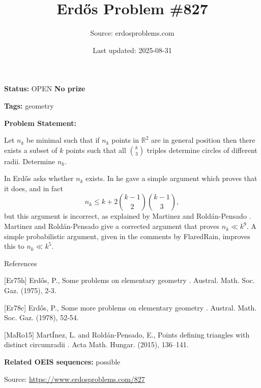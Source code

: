 \documentclass{article}
\title{Erd\H{o}s Problem \#827}
\date{Last updated: 2025-08-31}
\author{Source: erdosproblems.com}
\begin{document}
\maketitle

\noindent\textbf{Status:} OPEN \quad \textbf{No prize}

\noindent\textbf{Tags:} geometry

\medskip

\noindent\textbf{Problem Statement:}

Let $n_k$ be minimal such that if $n_k$ points in $\mathbb{R}^2$ are in general position then there exists a subset of $k$ points such that all $\binom{k}{3}$ triples determine circles of different radii. Determine $n_k$.




In \cite{Er75h} Erd\H{o}s asks whether $n_k$ exists. In \cite{Er78c} he gave a simple argument which proves that it does, and in fact\[n_k \leq k+2\binom{k-1}{2}\binom{k-1}{3},\]but this argument is incorrect, as explained by Martinez and Rold\'{a}n-Pensado \cite{MaRo15}. Martinez and Rold\'{a}n-Pensado give a corrected argument that proves $n_k\ll k^9$. A simple probabilistic argument, given in the comments by FlaredRain, improves this to $n_k\ll k^5$.




References

[Er75h] Erd\H{o}s, P., Some problems on elementary geometry . Austral. Math. Soc. Gaz. (1975), 2-3.

[Er78c] Erd\H{o}s, P., Some more problems on elementary geometry . Austral. Math. Soc. Gaz. (1978), 52-54.

[MaRo15] Mart\'Inez, L. and Rold\'{a}n-Pensado, E., Points defining triangles with distinct circumradii . Acta Math. Hungar. (2015), 136--141.

\noindent\textbf{Related OEIS sequences:} possible


\bigskip
\noindent\small{Source: \url{https://www.erdosproblems.com/827}}
\end{document}

